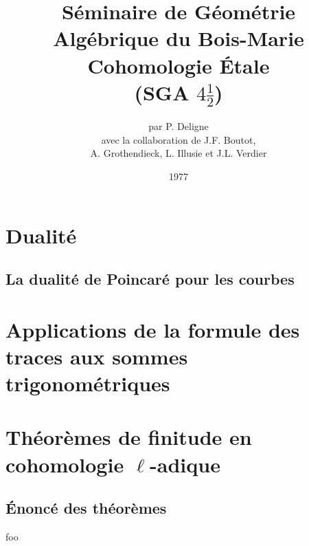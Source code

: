 \documentclass[oneside]{book} %
\title{Séminaire de Géométrie Algébrique du Bois-Marie \\ \vspace{20pt}
Cohomologie Étale \\ \vspace{20pt}
(SGA $4\frac 1 2$)}
\author{par P. Deligne \vspace{10pt}\\ 
avec la collaboration de J.F. Boutot, \\ A. Grothendieck, L. Illusie et J.L. Verdier}
\date{1977}
\begin{document}
\maketitle










\tableofcontents
{} %













%
%

\chapter{Dualité}\label{V}

\section{La dualité de Poincaré pour les courbes}\label{V:2}

\chapter{Applications de la formule des traces aux sommes trigonométriques}\label{VI}

\chapter{Théorèmes de finitude en cohomologie \texorpdfstring{$\ell$}{l}-adique}\label{VII}

\section{Énoncé des théorèmes}\label{VII:1}

\begin{theorem_}\label{VII:1-1}
foo
\end{theorem_}












\end{document}
